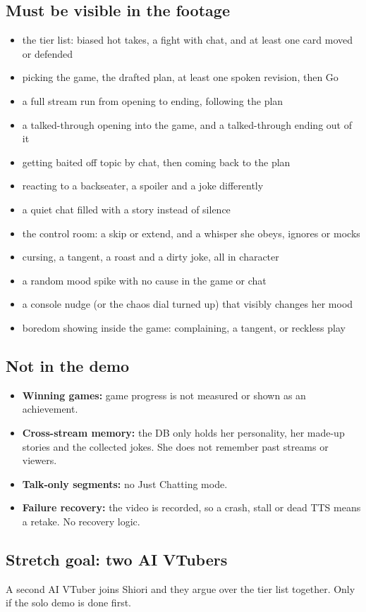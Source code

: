 \documentclass[11pt,a4paper]{article}
\begin{document}
\subsection{Must be visible in the footage}
\begin{itemize}
\item[$\square$] the tier list: biased hot takes, a fight with chat, and at least one card moved or defended
\item[$\square$] picking the game, the drafted plan, at least one spoken revision, then Go
\item[$\square$] a full stream run from opening to ending, following the plan
\item[$\square$] a talked-through opening into the game, and a talked-through ending out of it
\item[$\square$] getting baited off topic by chat, then coming back to the plan
\item[$\square$] reacting to a backseater, a spoiler and a joke differently
\item[$\square$] a quiet chat filled with a story instead of silence
\item[$\square$] the control room: a skip or extend, and a whisper she obeys, ignores or mocks
\item[$\square$] cursing, a tangent, a roast and a dirty joke, all in character
\item[$\square$] a random mood spike with no cause in the game or chat
\item[$\square$] a console nudge (or the chaos dial turned up) that visibly changes her mood
\item[$\square$] boredom showing inside the game: complaining, a tangent, or reckless play
\end{itemize}

\subsection{Not in the demo}
\begin{itemize}
\item \textbf{Winning games:} game progress is not measured or shown as an achievement.
\item \textbf{Cross-stream memory:} the DB only holds her personality, her made-up stories and the collected jokes. She does not remember past streams or viewers.
\item \textbf{Talk-only segments:} no Just Chatting mode.
\item \textbf{Failure recovery:} the video is recorded, so a crash, stall or dead TTS means a retake. No recovery logic.
\end{itemize}

\subsection{Stretch goal: two AI VTubers}
A second AI VTuber joins Shiori and they argue over the tier list together. Only if the solo demo is done first.
\end{document}
